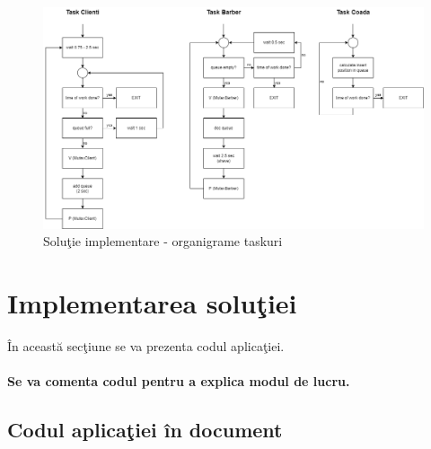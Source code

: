 \documentclass[a4paper, 11pt]{article}
\begin{document}
\paragraph{}

\begin{figure} [!htb]
\centering
\includegraphics[width=17.5cm]{./images/Organigrama.png}
\caption{\label{fig:taskuri}Solu\c{t}ie implementare - organigrame taskuri}
\end{figure} 



\section{Implementarea solu\c{t}iei}

\^{I}n aceast\u{a} sec\c{t}iune se va prezenta codul aplica\c{t}iei. 

\paragraph{Se va comenta codul pentru a explica modul de lucru.}

\subsection*{Codul aplica\c{t}iei \^{i}n document}

\medskip
\medskip
\end{document}
